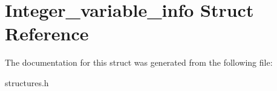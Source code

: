 \hypertarget{structInteger__variable__info}{}\section{Integer\+\_\+variable\+\_\+info Struct Reference}
\label{structInteger__variable__info}


The documentation for this struct was generated from the following file\+:\begin{DoxyCompactItemize}
\item 
structures.\+h\end{DoxyCompactItemize}
